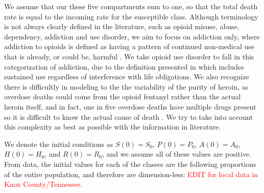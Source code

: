 \documentclass[12pt]{article}
\begin{document}
We assume that our these five compartments sum to one, so that the total death rate is equal to the incoming rate for the susceptible class. Although terminology is not always clearly defined in the literature, such as opioid misuse, abuse, dependency, addiction and use disorder, we aim to focus on addiction only, where addiction to opioids is defined as having a pattern of continued non-medical use that is already, or could be, harmful \cite{Vowles}. We take opioid use disorder to fall in this categorization of addiction, due to the definition presented in \cite{SAMSHA2} which includes sustained use regardless of interference with life obligations. We also recognize there is difficultly in modeling to the the variability of the purity of heroin, as overdose deaths could come from the opioid fentanyl rather than the actual heroin itself, and in fact, one in five overdose deaths have multiple drugs present so it is difficult to know the actual cause of death \cite{CDC4}. We try to take into account this complexity as best as possible with the information in literature. 

We denote the initial conditions as
$S(0)=S_{0}$, $P(0)=P_{0}$, $A(0)=A_{0}$, $H(0)=H_{0}$, and $R(0)=R_{0}$, and we assume all of these values are positive. From data, the initial values for each of the classes are the following proportions of the entire population, and therefore are dimension-less: \textcolor{red}{EDIT for local data in Knox County/Tennessee.}%
 
\end{document}
